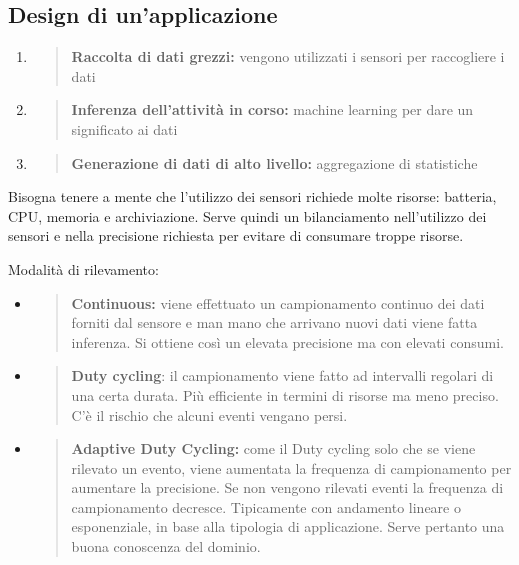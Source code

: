 \subsection{Design di un'applicazione}\label{design-di-unapplicazione}

\begin{enumerate}
\def\labelenumi{\arabic{enumi}.}
\item
  \begin{quote}
  \textbf{Raccolta di dati grezzi:} vengono utilizzati i sensori per
  raccogliere i dati
  \end{quote}
\item
  \begin{quote}
  \textbf{Inferenza dell'attività in corso:} machine learning per dare
  un significato ai dati
  \end{quote}
\item
  \begin{quote}
  \textbf{Generazione di dati di alto livello:} aggregazione di
  statistiche
  \end{quote}
\end{enumerate}

Bisogna tenere a mente che l'utilizzo dei sensori richiede molte
risorse: batteria, CPU, memoria e archiviazione. Serve quindi un
bilanciamento nell'utilizzo dei sensori e nella precisione richiesta per
evitare di consumare troppe risorse.

Modalità di rilevamento:

\begin{itemize}
\item
  \begin{quote}
  \textbf{Continuous:} viene effettuato un campionamento continuo dei
  dati forniti dal sensore e man mano che arrivano nuovi dati viene
  fatta inferenza. Si ottiene così un elevata precisione ma con elevati
  consumi.
  \end{quote}
\item
  \begin{quote}
  \textbf{Duty cycling}: il campionamento viene fatto ad intervalli
  regolari di una certa durata. Più efficiente in termini di risorse ma
  meno preciso. C'è il rischio che alcuni eventi vengano persi.
  \end{quote}
\item
  \begin{quote}
  \textbf{Adaptive Duty Cycling:} come il Duty cycling solo che se viene
  rilevato un evento, viene aumentata la frequenza di campionamento per
  aumentare la precisione. Se non vengono rilevati eventi la frequenza
  di campionamento decresce. Tipicamente con andamento lineare o
  esponenziale, in base alla tipologia di applicazione. Serve pertanto
  una buona conoscenza del dominio.
  \end{quote}
\end{itemize}

